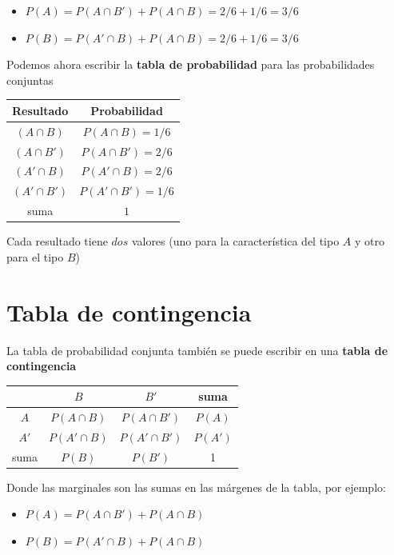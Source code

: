 \documentclass[
]{book}
\providecommand{\tightlist}{%
  \setlength{\itemsep}{0pt}\setlength{\parskip}{0pt}}
\begin{document}
\begin{itemize}
\tightlist
\item
  \(P(A)=P(A\cap B') + P(A \cap B)=2/6+1/6=3/6\)
\item
  \(P(B)=P(A'\cap B) +P(A \cap B)=2/6+1/6=3/6\)
\end{itemize}

Podemos ahora escribir la \textbf{tabla de probabilidad} para las probabilidades conjuntas

\begin{longtable}[]{@{}cc@{}}
\toprule\noalign{}
Resultado & Probabilidad \\
\midrule\noalign{}
\endhead
\bottomrule\noalign{}
\endlastfoot
\((A \cap B)\) & \(P(A \cap B)=1/6\) \\
\((A\cap B')\) & \(P(A \cap B')=2/6\) \\
\((A' \cap B)\) & \(P(A' \cap B)=2/6\) \\
\((A' \cap B')\) & \(P(A' \cap B')=1/6\) \\
suma & \(1\) \\
\end{longtable}

Cada resultado tiene \(dos\) valores (uno para la característica del tipo \(A\) y otro para el tipo \(B\))

\hypertarget{tabla-de-contingencia}{%
\section{Tabla de contingencia}\label{tabla-de-contingencia}}

La tabla de probabilidad conjunta también se puede escribir en una \textbf{tabla de contingencia}

\begin{longtable}[]{@{}cccc@{}}
\toprule\noalign{}
& \(B\) & \(B'\) & suma \\
\midrule\noalign{}
\endhead
\bottomrule\noalign{}
\endlastfoot
\(A\) & \(P(A \cap B )\) & \(P(A\cap B' )\) & \(P(A)\) \\
\(A'\) & \(P(A'\cap B )\) & \(P(A'\cap B' )\) & \(P(A')\) \\
suma & \(P(B)\) & \(P(B')\) & 1 \\
\end{longtable}

Donde las marginales son las sumas en las márgenes de la tabla, por ejemplo:

\begin{itemize}
\tightlist
\item
  \(P(A)=P(A \cap B') + P(A \cap B)\)
\item
  \(P(B)=P(A' \cap B) +P(A \cap B)\)
\end{itemize}
\end{document}
